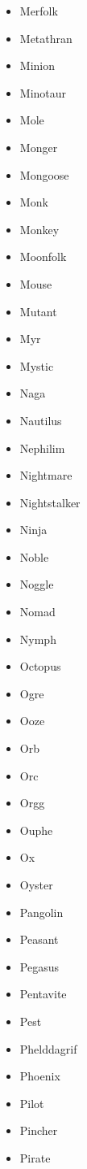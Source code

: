 \documentclass{article}
\begin{document}
\begin{multicols}{3}
\begin{itemize}
        \item Merfolk
        \item Metathran
        \item Minion
        \item Minotaur
        \item Mole
        \item Monger
        \item Mongoose
        \item Monk
        \item Monkey
        \item Moonfolk
        \item Mouse
        \item Mutant
        \item Myr
        \item Mystic
        \item Naga
        \item Nautilus
        \item Nephilim
        \item Nightmare
        \item Nightstalker
        \item Ninja
        \item Noble
        \item Noggle
        \item Nomad
        \item Nymph
        \item Octopus
        \item Ogre
        \item Ooze
        \item Orb
        \item Orc
        \item Orgg
        \item Ouphe
        \item Ox
        \item Oyster
        \item Pangolin
        \item Peasant
        \item Pegasus
        \item Pentavite
        \item Pest
        \item Phelddagrif
        \item Phoenix
        \item Pilot
        \item Pincher
        \item Pirate

\end{itemize}
\end{multicols}
\end{document}
